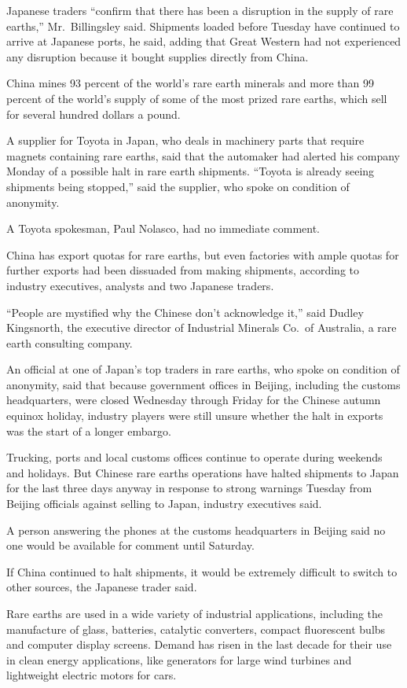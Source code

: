 ﻿\documentclass[12pt]{article}
\begin{document}
Japanese traders ``confirm that there has been a disruption in the supply of rare earths,''
Mr.~Billingsley said. Shipments loaded before Tuesday have continued to arrive at Japanese ports, he
said, adding that Great Western had not experienced any disruption because it bought supplies
directly from China.

China mines 93 percent of the world's rare earth minerals and more than 99 percent of the world's
supply of some of the most prized rare earths, which sell for several hundred dollars a pound.

A supplier for Toyota in Japan, who deals in machinery parts that require magnets containing rare
earths, said that the automaker had alerted his company Monday of a possible halt in rare earth
shipments. ``Toyota is already seeing shipments being stopped,'' said the supplier, who spoke on
condition of anonymity.

A Toyota spokesman, Paul Nolasco, had no immediate comment.

China has export quotas for rare earths, but even factories with ample quotas for further exports
had been dissuaded from making shipments, according to industry executives, analysts and two
Japanese traders.

``People are mystified why the Chinese don't acknowledge it,'' said Dudley Kingsnorth, the executive
director of Industrial Minerals Co.~of Australia, a rare earth consulting company.

An official at one of Japan's top traders in rare earths, who spoke on condition of anonymity, said
that because government offices in Beijing, including the customs headquarters, were closed
Wednesday through Friday for the Chinese autumn equinox holiday, industry players were still unsure
whether the halt in exports was the start of a longer embargo.

Trucking, ports and local customs offices continue to operate during weekends and holidays. But
Chinese rare earths operations have halted shipments to Japan for the last three days anyway in
response to strong warnings Tuesday from Beijing officials against selling to Japan, industry
executives said.

A person answering the phones at the customs headquarters in Beijing said no one would be available
for comment until Saturday.

If China continued to halt shipments, it would be extremely difficult to switch to other sources,
the Japanese trader said.

Rare earths are used in a wide variety of industrial applications, including the manufacture of
glass, batteries, catalytic converters, compact fluorescent bulbs and computer display screens.
Demand has risen in the last decade for their use in clean energy applications, like generators for
large wind turbines and lightweight electric motors for cars.
\end{document}
